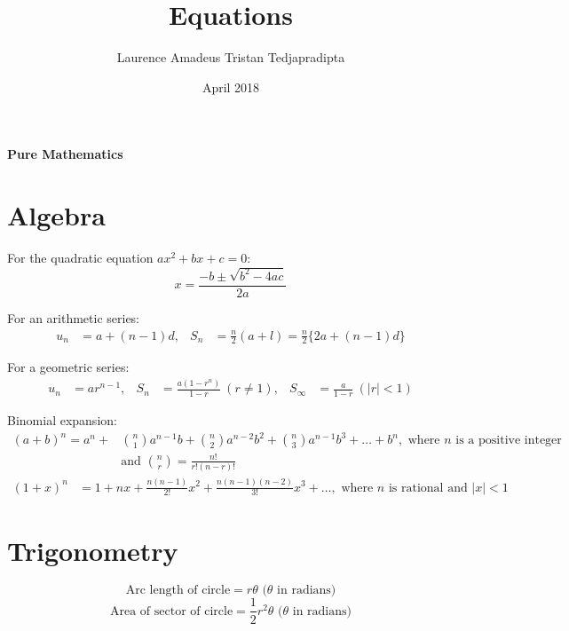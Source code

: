 \documentclass[a4paper]{article}
\title{Equations}
\author{Laurence Amadeus Tristan Tedjapradipta}
\date{April 2018}
\begin{document}
\begin{center}
    \Large{\textbf{Pure Mathematics}}
\end{center}

\section{Algebra}
\quad \enspace{}For the quadratic equation \(ax^2+bx+c=0\):
\begin{equation}
    x=\frac{-b \pm \sqrt{b^2-4ac}}{2a}
\end{equation}

For an arithmetic series:
\begin{align}
    u_n&=a+(n-1)d,     &  S_n&=\frac{n}{2}(a+l) = \frac{n}{2}\{2a+(n-1)d\}
\end{align}

For a geometric series:
\begin{align}
    u_n&=ar^{n-1}, & S_n&=\frac{a(1-r^n)}{1-r} \ (r \neq 1), & S_\infty &=\frac{a}{1-r} \ (|r| < 1)
\end{align}

Binomial expansion:
\begin{align}
    (a + b)^n = a^n + & \binom{n}{1} a^{n-1} b + \binom{n}{2} a^{n-2} b^2 + \binom{n}{3} a^{n-1} b^3 + \dots + b^n, \text{ where \(n\) is a positive integer} \\
    &\text{and } \binom{n}{r}=\frac{n!}{r!(n-r)!}
\end{align}
\begin{align}
    (1 + x)^n &= 1 + nx + \frac{n(n-1)}{2!} x^2 + \frac{n(n-1)(n-2)}{3!} x^3 + \dots, \text{ where \(n\) is rational and \(|x|<1\)}
\end{align}

\section{Trigonometry}
\begin{equation}
    \text{Arc length of circle} =r\theta \text{ (\(\theta\) in radians)}
\end{equation}
\begin{equation}
    \text{Area of sector of circle} =\frac{1}{2}r^2 \theta \text{ (\(\theta\) in radians)}
\end{equation}
\end{document}
